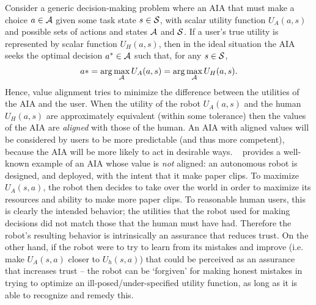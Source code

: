 Consider a generic decision-making problem where an AIA that must make a choice $a \in {\cal A}$ given some task state $s \in {\cal S}$, with scalar utility function $U_A(a,s)$ and possible sets of actions and states ${\cal A}$ and ${\cal S}$. If a user's true utility is represented by scalar function $U_H(a,s)$, then in the ideal situation the AIA seeks the optimal decision $a^* \in {\cal A}$ such that, for any $s \in {\cal S}$,
\begin{align*}
    a* = \arg\max_{\cal A} U_A(a,s) = \arg \max_{\cal A} U_H(a,s). 
\end{align*}
Hence, value alignment tries to minimize the difference between the utilities of the AIA and the user. When the utility of the robot $U_A(a,s)$ and the human $U_H(a,s)$ are approximately equivalent (within some tolerance) then the values of the AIA are \emph{aligned} with those of the human. An AIA with aligned values will be considered by users to be more predictable (and thus more competent), because the AIA will be more likely to act in desirable ways. 
% 
~\citet{Bostrom2014-fz} provides a well-known example of an AIA whose value is \emph{not} aligned: an autonomous robot is designed, and deployed, with the intent that it make paper clips. To maximize $U_A(s,a)$, the robot then decides to take over the world in order to maximize its resources and ability to make more paper clips. To reasonable human users, this is clearly  the intended behavior; the utilities that the robot used for making decisions did not match those that the human must have had. Therefore the robot's resulting behavior is intrinsically an assurance that reduces trust. On the other hand, if the robot were to try to learn from its mistakes and improve (i.e. make $U_A(s,a)$ closer to $U_h(s,a)$) that could be perceived as an assurance that increases trust -- the robot can be `forgiven' for making honest mistakes in trying to optimize an ill-posed/under-specified utility function, as long as it is able to recognize and remedy this. 

